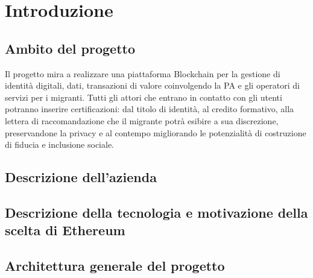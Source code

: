 \chapter{Introduzione}

\section{Ambito del progetto}
Il progetto mira a realizzare una piattaforma Blockchain per la gestione di identit\`a digitali, 
dati, transazioni di valore coinvolgendo la PA e gli operatori di servizi per i migranti. 
Tutti gli attori che entrano in contatto con gli utenti potranno inserire certificazioni: dal titolo di identit\`a, 
al credito formativo, alla lettera di raccomandazione che il migrante potrà esibire a sua discrezione, preservandone la privacy
e al contempo migliorando le potenzialit\`a di costruzione di fiducia e inclusione sociale. 

\section{Descrizione dell'azienda}

\section{Descrizione della tecnologia e motivazione della scelta di Ethereum}


\section{Architettura generale del progetto}